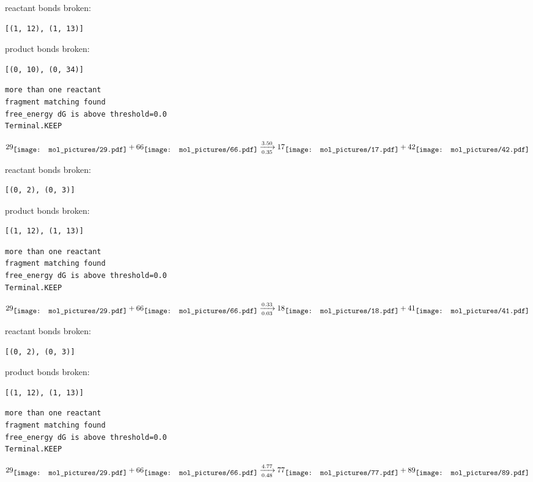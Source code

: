 \documentclass{article}
\begin{document}
reactant bonds broken:\begin{verbatim}
[(1, 12), (1, 13)]
\end{verbatim}
product bonds broken:\begin{verbatim}
[(0, 10), (0, 34)]
\end{verbatim}




\vspace{1cm}
\begin{verbatim}
more than one reactant
fragment matching found
free_energy dG is above threshold=0.0
Terminal.KEEP
\end{verbatim}
$$
29
\raisebox{-.5\height}{\texttt{[image: mol\_pictures/29.pdf]}}
+
66
\raisebox{-.5\height}{\texttt{[image: mol\_pictures/66.pdf]}}
\xrightarrow[0.35]{3.50}
17
\raisebox{-.5\height}{\texttt{[image: mol\_pictures/17.pdf]}}
+
42
\raisebox{-.5\height}{\texttt{[image: mol\_pictures/42.pdf]}}
$$


reactant bonds broken:\begin{verbatim}
[(0, 2), (0, 3)]
\end{verbatim}
product bonds broken:\begin{verbatim}
[(1, 12), (1, 13)]
\end{verbatim}




\vspace{1cm}
\begin{verbatim}
more than one reactant
fragment matching found
free_energy dG is above threshold=0.0
Terminal.KEEP
\end{verbatim}
$$
29
\raisebox{-.5\height}{\texttt{[image: mol\_pictures/29.pdf]}}
+
66
\raisebox{-.5\height}{\texttt{[image: mol\_pictures/66.pdf]}}
\xrightarrow[0.03]{0.33}
18
\raisebox{-.5\height}{\texttt{[image: mol\_pictures/18.pdf]}}
+
41
\raisebox{-.5\height}{\texttt{[image: mol\_pictures/41.pdf]}}
$$


reactant bonds broken:\begin{verbatim}
[(0, 2), (0, 3)]
\end{verbatim}
product bonds broken:\begin{verbatim}
[(1, 12), (1, 13)]
\end{verbatim}




\vspace{1cm}
\begin{verbatim}
more than one reactant
fragment matching found
free_energy dG is above threshold=0.0
Terminal.KEEP
\end{verbatim}
$$
29
\raisebox{-.5\height}{\texttt{[image: mol\_pictures/29.pdf]}}
+
66
\raisebox{-.5\height}{\texttt{[image: mol\_pictures/66.pdf]}}
\xrightarrow[0.48]{4.77}
77
\raisebox{-.5\height}{\texttt{[image: mol\_pictures/77.pdf]}}
+
89
\raisebox{-.5\height}{\texttt{[image: mol\_pictures/89.pdf]}}
$$
\end{document}
